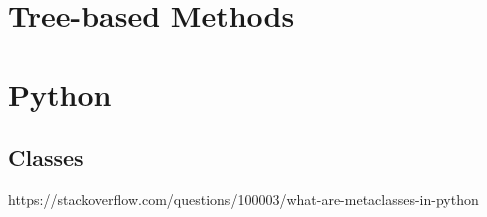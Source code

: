 \documentclass[11pt]{article}
\theoremstyle{definition}
\begin{document}
\section{}
\section{}
\section{Tree-based Methods}
\section{}
\section{}
\section{Python}
\subsection{Classes}
https://stackoverflow.com/questions/100003/what-are-metaclasses-in-python
\end{document}
